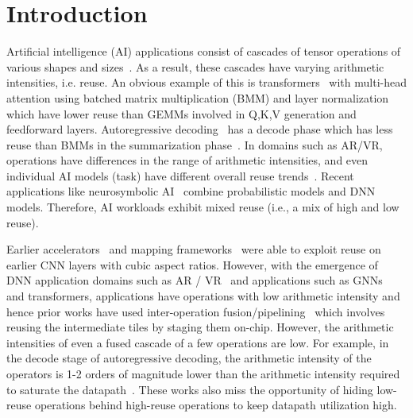 \section{Introduction}
\label{sec:introduction}

Artificial intelligence (AI) applications consist of  cascades of tensor operations of various shapes and sizes~\cite{kwon2018maeri,kwon2019understanding,flat}. As a result, these cascades have varying arithmetic intensities, i.e. reuse. An obvious example of this is transformers~\cite{attention} with multi-head attention using batched matrix multiplication (BMM) and layer normalization which have lower reuse than GEMMs involved in Q,K,V generation and feedforward layers. Autoregressive decoding~\cite{gpt4} has a decode phase which has less reuse than BMMs in the summarization phase~\cite{neupim}. In domains such as AR/VR, operations have differences in the range of arithmetic intensities, and even individual AI models (task) have different overall reuse trends~\cite{xrbench}. Recent applications like neurosymbolic AI~\cite{neurosymbolic} combine probabilistic models and DNN models. Therefore, AI workloads exhibit mixed reuse (i.e., a mix of high and low reuse). 

Earlier accelerators~\cite{kwon2018maeri,tpu-isca,eyeriss2016isca,nvdla} and mapping frameworks~\cite{kao2020gamma,cosa,kwon2019understanding,interstellar,timeloop,pipeorgan} were able to exploit reuse on earlier CNN layers with cubic aspect ratios. However, with the emergence of DNN application domains such as AR / VR~\cite{xrbench} and applications such as GNNs~\cite{hamilton2017inductive} and transformers, applications have operations with low arithmetic intensity and hence prior works have used inter-operation fusion/pipelining~\cite{garg2021understanding,flat,flashattention,pipeorgan,tileflow,isca-pip,isos,tangram} which involves reusing the intermediate tiles by staging them on-chip. However, the arithmetic intensities of even a fused cascade of a few operations are low. For example, in the decode stage of autoregressive decoding, the arithmetic intensity of the operators is 1-2 orders of magnitude lower than the arithmetic intensity required to saturate the datapath~\cite{neupim}. These works also miss the opportunity of hiding low-reuse operations behind high-reuse operations to keep datapath utilization high.

